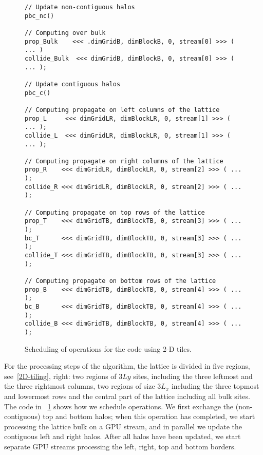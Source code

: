 \documentclass{elsarticle}
\begin{document}
%
\begin{figure}
\centering
\begin{lstlisting}[basicstyle=\scriptsize]
// Update non-contiguous halos
pbc_nc()

// Computing over bulk
prop_Bulk    <<< .dimGridB, dimBlockB, 0, stream[0] >>> ( ... )
collide_Bulk  <<< dimGridB, dimBlockB, 0, stream[0] >>> ( ... );

// Update contiguous halos
pbc_c()

// Computing propagate on left columns of the lattice
prop_L     <<< dimGridLR, dimBlockLR, 0, stream[1] >>> ( ... );
collide_L  <<< dimGridLR, dimBlockLR, 0, stream[1] >>> ( ... );

// Computing propagate on right columns of the lattice
prop_R    <<< dimGridLR, dimBlockLR, 0, stream[2] >>> ( ... );
collide_R <<< dimGridLR, dimBlockLR, 0, stream[2] >>> ( ... );

// Computing propagate on top rows of the lattice
prop_T    <<< dimGridTB, dimBlockTB, 0, stream[3] >>> ( ... );
bc_T      <<< dimGridTB, dimBlockTB, 0, stream[3] >>> ( ... );
collide_T <<< dimGridTB, dimBlockTB, 0, stream[3] >>> ( ... );

// Computing propagate on bottom rows of the lattice
prop_B    <<< dimGridTB, dimBlockTB, 0, stream[4] >>> ( ... );
bc_B      <<< dimGridTB, dimBlockTB, 0, stream[4] >>> ( ... );
collide_B <<< dimGridTB, dimBlockTB, 0, stream[4] >>> ( ... );

\end{lstlisting}
\caption{\label{2D-code-with-overlap} 
Scheduling of operations for the code using 2-D tiles.
}
\end{figure}
%

For the processing steps of the algorithm, the lattice is divided in five 
regions, see~\figurename{\ref{2D-tiling}}, right: 
two regions of $3 Ly$ sites, including the three leftmost 
and the three rightmost columns, two regions of size $3 L_x$ including 
the three topmost and lowermost rows and the central part of the lattice 
including all bulk sites. 
%
The code in \figurename~\ref{2D-code-with-overlap} shows how we schedule 
operations. 
%
We first exchange the (non-contiguous) top and bottom halos; when 
this operation has completed, we start processing the lattice bulk on a 
GPU stream, and in parallel we update the contiguous left and right halos.
%
After all halos have been updated, we start separate GPU streams 
processing the left, right, top and bottom borders.
\end{document}
